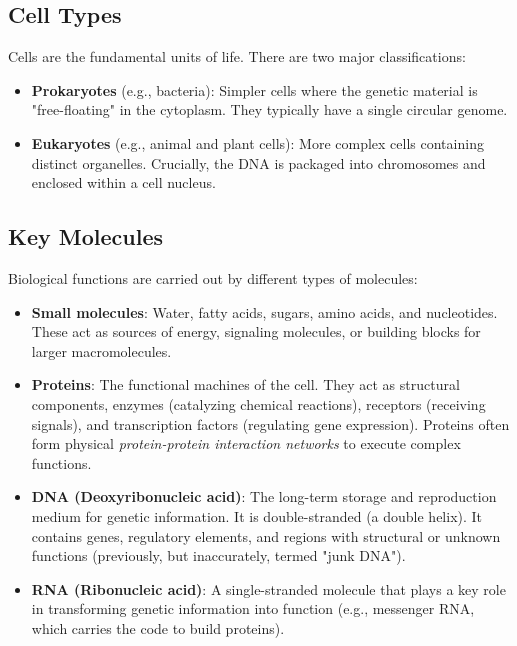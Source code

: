 \subsection{Cell Types}
Cells are the fundamental units of life. There are two major classifications:
\begin{itemize}
  \item \textbf{Prokaryotes} (e.g., bacteria): Simpler cells where the genetic material is "free-floating" in the cytoplasm. They typically have a single circular genome.
  \item \textbf{Eukaryotes} (e.g., animal and plant cells): More complex cells containing distinct organelles. Crucially, the DNA is packaged into chromosomes and enclosed within a cell nucleus.
\end{itemize}


\subsection{Key Molecules}
Biological functions are carried out by different types of molecules:
\begin{itemize}
  \item \textbf{Small molecules}: Water, fatty acids, sugars, amino acids, and nucleotides. These act as sources of energy, signaling molecules, or building blocks for larger macromolecules.
  \item \textbf{Proteins}: The functional machines of the cell. They act as structural components, enzymes (catalyzing chemical reactions), receptors (receiving signals), and transcription factors (regulating gene expression). Proteins often form physical \textit{protein-protein interaction networks} to execute complex functions.
  \item \textbf{DNA (Deoxyribonucleic acid)}: The long-term storage and reproduction medium for genetic information. It is double-stranded (a double helix). It contains genes, regulatory elements, and regions with structural or unknown functions (previously, but inaccurately, termed "junk DNA").
  \item \textbf{RNA (Ribonucleic acid)}: A single-stranded molecule that plays a key role in transforming genetic information into function (e.g., messenger RNA, which carries the code to build proteins).
\end{itemize}

